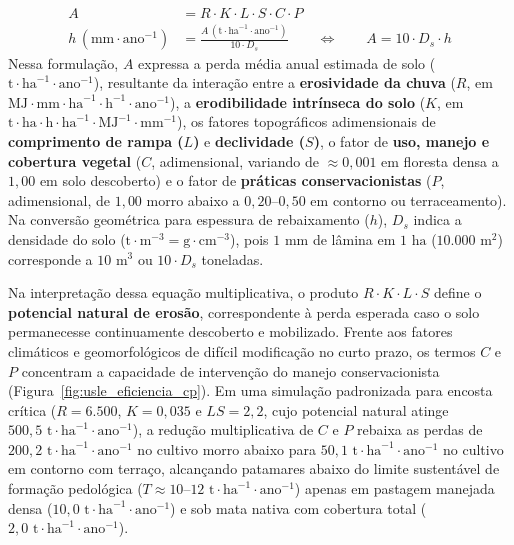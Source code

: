 \begin{boxFormula}
\begin{align}
  A &= R \cdot K \cdot L \cdot S \cdot C \cdot P \\[4pt]
  h\,(\text{mm}\cdot\text{ano}^{-1}) &= \frac{A\,(\text{t}\cdot\text{ha}^{-1}\cdot\text{ano}^{-1})}{10 \cdot D_s} \qquad \Longleftrightarrow \qquad A = 10 \cdot D_s \cdot h
\end{align}
Nessa formulação, $A$ expressa a perda média anual estimada de solo ($\text{t}\cdot\text{ha}^{-1}\cdot\text{ano}^{-1}$), resultante da interação entre a \textbf{erosividade da chuva} ($R$, em $\text{MJ}\cdot\text{mm}\cdot\text{ha}^{-1}\cdot\text{h}^{-1}\cdot\text{ano}^{-1}$), a \textbf{erodibilidade intrínseca do solo} ($K$, em $\text{t}\cdot\text{ha}\cdot\text{h}\cdot\text{ha}^{-1}\cdot\text{MJ}^{-1}\cdot\text{mm}^{-1}$), os fatores topográficos adimensionais de \textbf{comprimento de rampa ($L$)} e \textbf{declividade ($S$)}, o fator de \textbf{uso, manejo e cobertura vegetal} ($C$, adimensional, variando de $\approx 0{,}001$ em floresta densa a $1{,}00$ em solo descoberto) e o fator de \textbf{práticas conservacionistas} ($P$, adimensional, de $1{,}00$ morro abaixo a $0{,}20\text{--}0{,}50$ em contorno ou terraceamento). Na conversão geométrica para espessura de rebaixamento ($h$), $D_s$ indica a densidade do solo ($\text{t}\cdot\text{m}^{-3} = \text{g}\cdot\text{cm}^{-3}$), pois $1\text{ mm}$ de lâmina em $1\text{ ha}$ ($10.000\text{ m}^2$) corresponde a $10\text{ m}^3$ ou $10 \cdot D_s$ toneladas.
\end{boxFormula}

Na interpretação dessa equação multiplicativa, o produto $R \cdot K \cdot L \cdot S$ define o \textbf{potencial natural de erosão}, correspondente à perda esperada caso o solo permanecesse continuamente descoberto e mobilizado. Frente aos fatores climáticos e geomorfológicos de difícil modificação no curto prazo, os termos $C$ e $P$ concentram a capacidade de intervenção do manejo conservacionista (Figura~\ref{fig:usle_eficiencia_cp}). Em uma simulação padronizada para encosta crítica ($R = 6.500$, $K = 0{,}035$ e $LS = 2{,}2$, cujo potencial natural atinge $500{,}5\text{ t}\cdot\text{ha}^{-1}\cdot\text{ano}^{-1}$), a redução multiplicativa de $C$ e $P$ rebaixa as perdas de $200{,}2\text{ t}\cdot\text{ha}^{-1}\cdot\text{ano}^{-1}$ no cultivo morro abaixo para $50{,}1\text{ t}\cdot\text{ha}^{-1}\cdot\text{ano}^{-1}$ no cultivo em contorno com terraço, alcançando patamares abaixo do limite sustentável de formação pedológica ($T \approx 10\text{--}12\text{ t}\cdot\text{ha}^{-1}\cdot\text{ano}^{-1}$) apenas em pastagem manejada densa ($10{,}0\text{ t}\cdot\text{ha}^{-1}\cdot\text{ano}^{-1}$) e sob mata nativa com cobertura total ($2{,}0\text{ t}\cdot\text{ha}^{-1}\cdot\text{ano}^{-1}$).

